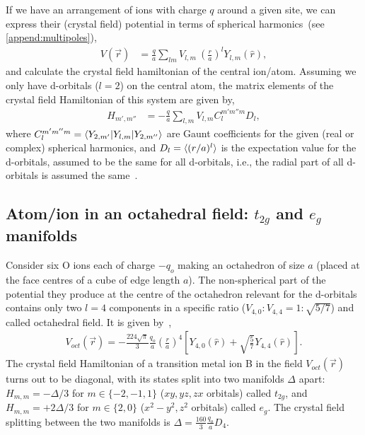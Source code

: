 \documentclass[a4paper,prb,twocolumn]{revtex4-1}  %
\newcommand{\ylm}[1]{Y_{#1}(\hat r)}
\begin{document}
If we have an arrangement of ions with charge $q$ around a given site,
we can express their (crystal field) potential in terms of spherical harmonics~(see \ref{append:multipoles}), 
\begin{align}
V(\vec r) &= \frac{q}{a}\sum_{lm}V_{l,m}~\left(\frac{r}{a}\right)^l \ylm{l,m},
\end{align}
and calculate the crystal field hamiltonian of the central ion/atom.
Assuming we only have d-orbitals ($l=2$) on the central atom,
the matrix elements of the crystal field Hamiltonian of this system 
are given by,
\begin{align}
H_{m',m''} &= -\frac{q}{a}\sum_{l,m} V_{l,m} C_{l}^{m'm''m} D_{l} ,
\end{align}
where 
$C_{l}^{m'm''m}=\braket{Y_{2,m'}| Y_{l,m}| Y_{2,m''}}$ are Gaunt coefficients for the given (real or complex) spherical harmonics,
and $D_{l}=\braket{(r/a)^l}$ is the expectation value for the d-orbitals, assumed to be the same for all d-orbitals, i.e., the radial part of all d-orbitals is assumed the same~\cite{paxton-notes}.

\subsection{Atom/ion in an octahedral field: $t_{2g}$  and $e_g$ manifolds}
\label{sec:egt2g}
Consider six O ions each of charge $-q_o$ making an octahedron of size $a$ (placed at the face centres of a cube of edge length $a$).
The non-spherical part of the potential they
 produce at the centre of the octahedron
 relevant for the d-orbitals contains 
 only two $l=4$ components
  in a specific ratio (${V_{4,0}:V_{4,4}=1:\sqrt{5/7}}$)
 and called octahedral field. 
It is given by~\cite{pavariniChap},
\begin{align}
\label{eq:voct}
V_{oct}(\vec r) = -\frac{224\sqrt{\pi}}{3}\frac{q_o}{a} \left(\frac{r}{a}\right)^4\left[\ylm{4,0}+\sqrt{\frac{5}{7}}\ylm{4,4} \right].
\end{align}
The crystal field Hamiltonian of a transition metal ion B 
in the field $V_{oct}(\vec r)$
turns out to be diagonal,
with its states split into two manifolds $\Delta$ apart:
$H_{m,m} = -\Delta/3$ for $m\in\{-2,-1,1\}$ ($xy,yz,zx$ orbitals)
called $t_{2g}$,
and 
$H_{m,m} = +2\Delta/3$ for $m\in\{2,0\}$ ($x^2-y^2,z^2$ orbitals)
called $e_g$.
The crystal field splitting between the two manifolds is
${\Delta=\frac{160}{3}\frac{q_o}{a} D_{4}}$.
\end{document}

